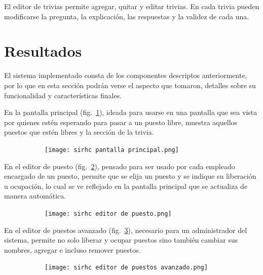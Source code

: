 \documentclass[twoside]{article}
\begin{document}
El editor de trivias permite agregar, quitar y editar trivias. En cada trivia pueden modificarse la pregunta, la explicación, las respuestas y la validez de cada una.
\newpage
\section{Resultados}
El sistema implementado consta de los componentes descriptos anteriormente, por lo que en esta sección podrán verse el aspecto que tomaron, detalles sobre su funcionalidad y características finales.

En la pantalla principal (fig.~\ref{fig:pantallaPrincipal}), ideada para usarse en una pantalla que sea vista por quienes estén esperando para pasar a un puesto libre, muestra aquellos puestos que estén libres y la sección de la trivia.
\begin{figure}[H]
	\caption{Interfaz de la pantalla principal del sistema}
    \begin{subfigure}{1\textwidth}
	\texttt{[image: sirhc pantalla principal.png]}
    \end{subfigure}
	\label{fig:pantallaPrincipal}
\end{figure}
\vspace{-1.0\baselineskip}
En el editor de puesto (fig.~\ref{fig:editorPuesto}), pensado para ser usado por cada empleado encargado de un puesto, permite que se elija un puesto y se indique su liberación u ocupación, lo cual se ve reflejado en la pantalla principal que se actualiza de manera automática.
\begin{figure}[H]
	\caption{Interfaz del editor de puesto}
    \begin{subfigure}{1\textwidth}
	\texttt{[image: sirhc editor de puesto.png]}
    \end{subfigure}
	\label{fig:editorPuesto}
\end{figure}
\vspace{-1.0\baselineskip}
En el editor de puestos avanzado (fig.~\ref{fig:editorPuestosAvanzado}), necesario para un administrador del sistema, permite no solo liberar y ocupar puestos sino también cambiar sus nombres, agregar e incluso remover puestos.
\begin{figure}[H]
	\caption{Interfaz del editor de puestos avanzado}
    \begin{subfigure}{1\textwidth}
	\texttt{[image: sirhc editor de puestos avanzado.png]}
    \end{subfigure}
	\label{fig:editorPuestosAvanzado}
\end{figure}
\end{document}
